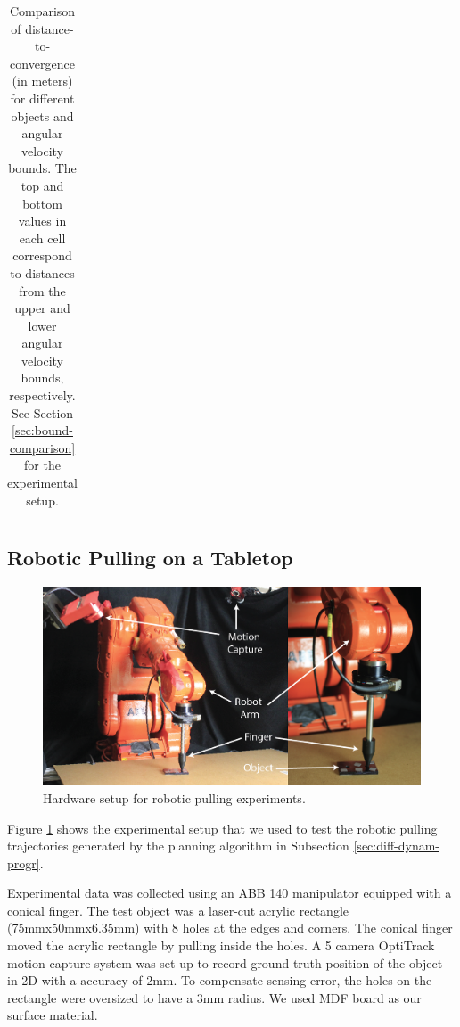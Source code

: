 \documentclass[conference]{IEEEtran}
\begin{document}
\begin{table}[t]
\begin{center}
\begin{tabular}[c]{cccc}
        \bottomrule
      \end{tabular}
  \end{center}
  \caption{Comparison of distance-to-convergence (in meters) for different objects and angular velocity bounds. The top and bottom values in each cell correspond to distances from the upper and lower angular velocity bounds, respectively. See Section \ref{sec:bound-comparison} for the experimental setup.}
  \label{table:convergence-distance}
\end{table}

\subsection{Robotic Pulling on a Tabletop}
\begin{figure}
  \begin{center}
    \includegraphics[width=\columnwidth]{fig/hardware.png}
  \end{center}
  \caption{Hardware setup for robotic pulling experiments.}
  \label{fig:hardware}
\end{figure}

Figure \ref{fig:hardware} shows the experimental setup that we used to
test the robotic pulling trajectories generated by the planning
algorithm in Subsection \ref{sec:diff-dynam-progr}.


Experimental data was collected using an ABB 140 manipulator equipped
with a conical finger. The test object was a laser-cut acrylic
rectangle (75mmx50mmx6.35mm) with 8 holes at the edges and
corners. The conical finger moved the acrylic rectangle by pulling
inside the holes.  A 5 camera OptiTrack motion capture system was set
up to record ground truth position of the object in 2D with a accuracy
of 2mm. To compensate sensing error, the holes on the rectangle were
oversized to have a 3mm radius. We used MDF board as our surface
material.
\end{document}
